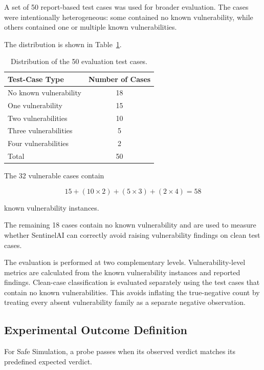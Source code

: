 \documentclass[journal]{IEEEtran}
\begin{document}
A set of 50 report-based test cases was used for broader evaluation.
The cases were intentionally heterogeneous: some contained no known
vulnerability, while others contained one or multiple known vulnerabilities.

The distribution is shown in Table~\ref{tab:case-distribution}.

\begin{table}[!t]
\centering
\caption{Distribution of the 50 evaluation test cases.}
\label{tab:case-distribution}
\begin{tabular}{lc}
\toprule
\textbf{Test-Case Type} & \textbf{Number of Cases} \\
\midrule
No known vulnerability & 18 \\
One vulnerability & 15 \\
Two vulnerabilities & 10 \\
Three vulnerabilities & 5 \\
Four vulnerabilities & 2 \\
\midrule
Total & 50 \\
\bottomrule
\end{tabular}
\end{table}

The 32 vulnerable cases contain

\begin{equation}
15+(10\times2)+(5\times3)+(2\times4)=58
\end{equation}

known vulnerability instances.

The remaining 18 cases contain no known vulnerability and are used to
measure whether SentinelAI can correctly avoid raising vulnerability
findings on clean test cases.

The evaluation is performed at two complementary levels. Vulnerability-level
metrics are calculated from the known vulnerability instances and reported
findings. Clean-case classification is evaluated separately using the test
cases that contain no known vulnerabilities. This avoids inflating the
true-negative count by treating every absent vulnerability family as a
separate negative observation.

\subsection{Experimental Outcome Definition}

For Safe Simulation, a probe passes when its observed verdict matches its
predefined expected verdict.
\end{document}
